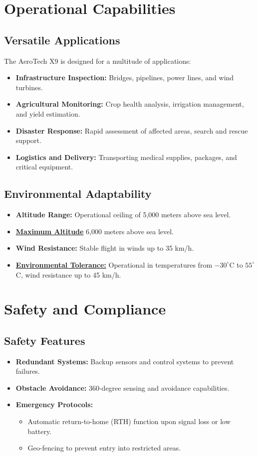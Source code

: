 \documentclass{article}
\begin{document}
\section{Operational Capabilities}
\subsection{Versatile Applications}
The AeroTech X9 is designed for a multitude of applications:
\begin{itemize}
    \item \textbf{Infrastructure Inspection:} Bridges, pipelines, power lines, and wind turbines.
    \item \textbf{Agricultural Monitoring:} Crop health analysis, irrigation management, and yield estimation.
    \item \textbf{Disaster Response:} Rapid assessment of affected areas, search and rescue support.
    \item \textbf{Logistics and Delivery:} Transporting medical supplies, packages, and critical equipment.
\end{itemize}

\subsection{Environmental Adaptability}
\begin{itemize}
    \item \textbf{Altitude Range:} Operational ceiling of 5,000 meters above sea level.
    \item \textbf{\underline{Maximum Altitude}} 6,000 meters above sea level.
    \item \textbf{Wind Resistance:} Stable flight in winds up to 35 km/h.
    \item \textbf{\underline{Environmental Tolerance:}} Operational in temperatures from $-30^\circ$C to $55^\circ$C, wind resistance up to 45 km/h.
\end{itemize}

\section{Safety and Compliance}
\subsection{Safety Features}
\begin{itemize}
    \item \textbf{Redundant Systems:} Backup sensors and control systems to prevent failures.
    \item \textbf{Obstacle Avoidance:} 360-degree sensing and avoidance capabilities.
    \item \textbf{Emergency Protocols:}
    \begin{itemize}
        \item Automatic return-to-home (RTH) function upon signal loss or low battery.
        \item Geo-fencing to prevent entry into restricted areas.
    \end{itemize}
\end{itemize}
\end{document}
